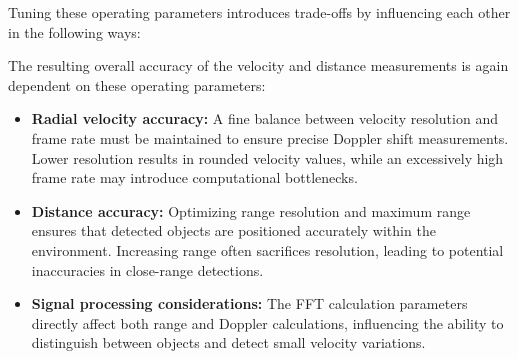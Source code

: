 Tuning these operating parameters introduces trade-offs by influencing each other in the following ways:
\begin{table}[h]
    \centering
    \caption{Radar System Tuning Parameters and Trade-offs}
    \label{tab:mmWave_Sensor_Parameters}
\end{table}
The resulting overall accuracy of the velocity and distance measurements is again dependent on these operating parameters:
\begin{itemize}
\item \textbf{Radial velocity accuracy:} A fine balance between velocity resolution and frame rate must be maintained to ensure precise Doppler shift measurements. Lower resolution results in rounded velocity values, while an excessively high frame rate may introduce computational bottlenecks.
\item \textbf{Distance accuracy:} Optimizing range resolution and maximum range ensures that detected objects are positioned accurately within the environment. Increasing range often sacrifices resolution, leading to potential inaccuracies in close-range detections.
\item \textbf{Signal processing considerations:} The FFT calculation parameters directly affect both range and Doppler calculations, influencing the ability to distinguish between objects and detect small velocity variations.
\end{itemize}
